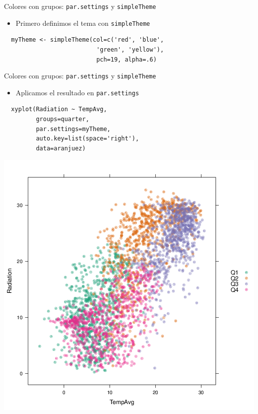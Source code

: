 \documentclass[xcolor={usenames,svgnames,dvipsnames}]{beamer}
\begin{document}
\begin{frame}[fragile,label=sec-3-22]{Colores con grupos: \texttt{par.settings} y \texttt{simpleTheme}}
 \begin{itemize}
\item Primero definimos el tema con \texttt{simpleTheme}
\end{itemize}
\lstset{language=R,label= ,caption= ,numbers=none}
\begin{lstlisting}
  myTheme <- simpleTheme(col=c('red', 'blue',
                          'green', 'yellow'),
                          pch=19, alpha=.6)
\end{lstlisting}
\end{frame}

\begin{frame}[fragile,label=sec-3-23]{Colores con grupos: \texttt{par.settings} y \texttt{simpleTheme}}
 \begin{itemize}
\item Aplicamos el resultado en \texttt{par.settings}
\end{itemize}
\lstset{language=R,label= ,caption= ,numbers=none}
\begin{lstlisting}
  xyplot(Radiation ~ TempAvg,
         groups=quarter,
         par.settings=myTheme,
         auto.key=list(space='right'),
         data=aranjuez)
\end{lstlisting}
\end{frame}

\begin{frame}[label=sec-3-24]{}
\includegraphics[width=.9\linewidth]{figs/myTheme.png}
\end{frame}
\end{document}
